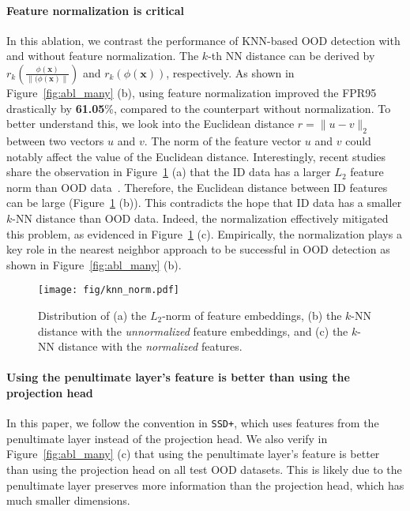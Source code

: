 \documentclass[nohyperref]{article}
\newcommand{\bx}{\mathbf{x}}
\theoremstyle{plain}
\theoremstyle{definition}
\theoremstyle{remark}
\begin{document}
\paragraph{Feature normalization is critical}
In this ablation, we contrast the performance of KNN-based OOD detection with and without feature normalization. The $k$-th NN distance can be derived by  $r_k(\frac{\phi(\bx)}{\lVert(\phi(\bx)\rVert})$ and $r_k(\phi(\bx))$, respectively. 
As shown in Figure~\ref{fig:abl_many} (b), using feature normalization improved the FPR95 drastically by \textbf{61.05}\%, compared to the counterpart without normalization. To better understand this, we look into  the Euclidean distance $r=\lVert u - v \rVert_2$ between two vectors $u$ and $v$. The norm of the feature vector $u$ and $v$ could notably affect the value of the Euclidean distance. Interestingly, recent studies share the observation in Figure~\ref{fig:knn_norm} (a) that the ID data has a larger $L_2$ feature norm than OOD data~\citep{tack2020csi, huang2021importance}. Therefore, the Euclidean distance between ID features can be large (Figure~\ref{fig:knn_norm} (b)).  This contradicts the hope that ID data has a smaller $k$-NN distance than OOD data. 
Indeed, the normalization effectively mitigated this problem, as evidenced in Figure~\ref{fig:knn_norm} (c). Empirically, the normalization plays a key role in the nearest neighbor approach to be successful in OOD detection as shown in Figure~\ref{fig:abl_many} (b).




\begin{figure}[t]
\begin{center}
		\texttt{[image: fig/knn\_norm.pdf]}
	\end{center}	
	\vspace{-0.3cm}
	\caption{\small Distribution of (a) the $L_2$-norm of feature embeddings, (b) the $k$-NN distance with the \emph{unnormalized} feature embeddings, and (c) the $k$-NN distance with the \emph{normalized} features. }
	\label{fig:knn_norm}
\vspace{-0.3cm}
\end{figure} 










\vspace{-0.1cm}
\paragraph{Using the penultimate layer's feature is better than using the projection head}
In this paper, we follow the convention in \texttt{SSD+}, which uses features from the penultimate layer instead of the projection head. We also verify in Figure~\ref{fig:abl_many} (c) that using the penultimate layer's feature is better than using the projection head on all test OOD datasets. This is likely due to the penultimate layer preserves more information than the projection head, which has much smaller dimensions. 
\end{document}
